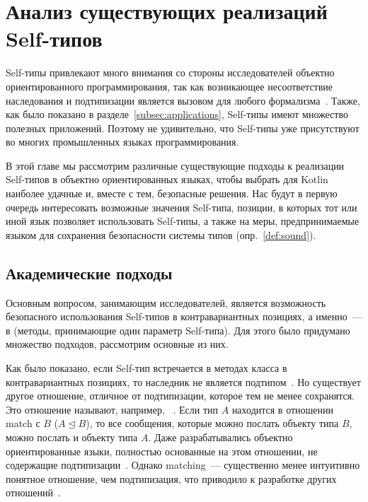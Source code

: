 \section{Анализ существующих реализаций Self-типов} \label{sec:impls}

Self-типы привлекают много внимания со стороны исследователей объектно ориентированного программирования, так как возникающее несоответствие наследования и подтипизации является вызовом для любого формализма~\cite{cook1989inheritance}.
Также, как было показано в разделе~\ref{subsec:applications}, Self-типы имеют множество полезных приложений.
Поэтому не удивительно, что Self-типы уже присутствуют во многих промышленных языках программирования.

В этой главе мы рассмотрим различные существующие подходы к реализации Self-типов в объектно ориентированных языках, чтобы выбрать для Kotlin наиболее удачные и, вместе с тем, безопасные решения.
Нас будут в первую очередь интересовать возможные значения Self-типа, позиции, в которых тот или иной язык позволяет использовать Self-типы, а также на меры, предпринимаемые языком для сохранения безопасности системы типов (опр.~\ref{def:sound}).


\subsection{Академические подходы} \label{subsec:academic-approaches}

Основным вопросом, занимающим исследователей, является возможность безопасного использования Self-типов в контравариантных позициях, а именно~--- в  (методы, принимающие один параметр Self-типа).
Для этого было придумано множество подходов, рассмотрим основные из них.

Как было показано, если Self-тип встречается в методах класса в контравариантных позициях, то наследник не является подтипом~\cite{cook1989inheritance}.
Но существует другое отношение, отличное от подтипизации, которое тем не менее сохранятся.
Это отношение называют, например, ~\cite{bruce1993safe}.
Если тип $A$ находится в отношении match с $B$ ($A \trianglelefteq B$), то все сообщения, которые можно послать объекту типа $B$, можно послать и объекту типа $A$.
Даже разрабатывались объектно ориентированные языки, полностью основанные на этом отношении, не содержащие подтипизации~\cite{bruce1997subtyping}.
Однако matching~--- существенно менее интуитивно понятное отношение, чем подтипизация, что приводило к разработке других отношений~\cite{ryu2016thistype}.

